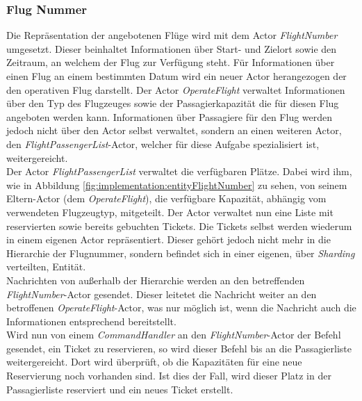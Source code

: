 \subsubsection{Flug Nummer}
Die Repräsentation der angebotenen Flüge wird mit dem Actor \textit{FlightNumber} umgesetzt. Dieser beinhaltet Informationen über Start- und Zielort sowie den Zeitraum, an welchem der Flug zur Verfügung steht. Für Informationen über einen Flug an einem bestimmten Datum wird ein neuer Actor herangezogen der den operativen Flug darstellt. Der Actor \textit{OperateFlight} verwaltet Informationen über den Typ des Flugzeuges sowie der Passagierkapazität die für diesen Flug angeboten werden kann. Informationen über Passagiere für den Flug werden jedoch nicht über den Actor selbst verwaltet, sondern an einen weiteren Actor, den \textit{FlightPassengerList}-Actor, welcher für diese Aufgabe spezialisiert ist, weitergereicht. \\
Der Actor \textit{FlightPassengerList} verwaltet die verfügbaren Plätze. Dabei wird ihm, wie in Abbildung \ref{fig:implementation:entityFlightNumber} zu sehen, von seinem Eltern-Actor (dem \textit{OperateFlight}), die verfügbare Kapazität, abhängig vom verwendeten Flugzeugtyp, mitgeteilt. Der Actor verwaltet nun eine Liste mit reservierten sowie bereits gebuchten Tickets. Die Tickets selbst werden wiederum in einem eigenen Actor repräsentiert. Dieser gehört jedoch nicht mehr in die Hierarchie der Flugnummer, sondern befindet sich in einer eigenen, über \textit{Sharding} verteilten, Entität. \\
Nachrichten von außerhalb der Hierarchie werden an den betreffenden \textit{FlightNumber}-Actor gesendet. Dieser leitetet die Nachricht weiter an den betroffenen \textit{OperateFlight}-Actor, was nur möglich ist, wenn die Nachricht auch die Informationen entsprechend bereitstellt. \\
Wird nun von einem \textit{CommandHandler} an den \textit{FlightNumber}-Actor der Befehl gesendet, ein Ticket zu reservieren, so wird dieser Befehl bis an die Passagierliste weitergereicht. Dort wird überprüft, ob die Kapazitäten für eine neue Reservierung noch vorhanden sind. Ist dies der Fall, wird dieser Platz in der Passagierliste reserviert und ein neues Ticket erstellt. 
